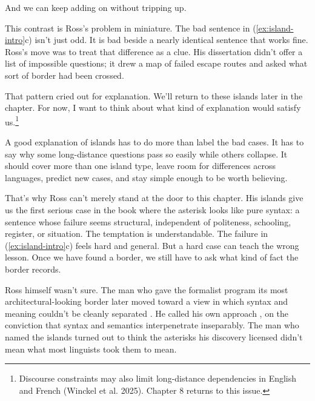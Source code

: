 \ea
\label{ex:non-island}
\z\z

And we can keep adding on without tripping up.

\ea
\label{ex:non-island-deep}
\z\z

This contrast is Ross's problem in miniature. The bad sentence in
(\ref{ex:island-intro}c) isn't just odd. It is bad beside a nearly
identical sentence that works fine. Ross's move was to treat that
difference as a clue. His dissertation didn't offer a list of impossible
questions; it drew a map of failed escape routes and asked what sort of
border had been crossed.

That pattern cried out for explanation. We'll return to these islands
later in the chapter. For now, I want to think about what kind of
explanation would satisfy us.\footnote{Discourse constraints may also
limit long-distance dependencies in English and French (Winckel et al.
2025). Chapter 8 returns to this issue. %
}



A good explanation of islands has to do more than label the bad cases. It
has to say why some long-distance questions pass so easily while others
collapse. It should cover more than one island type, leave room for
differences across languages, predict new cases, and stay simple enough
to be worth believing.

That's why Ross can't merely stand at the door to this chapter. His
islands give us the first serious case in the book where the asterisk
looks like pure syntax: a sentence whose failure seems structural,
independent of politeness, schooling, register, or situation. The
temptation is understandable. The failure in (\ref{ex:island-intro}c)
feels hard and general. But a hard case can teach the wrong lesson. Once
we have found a border, we still have to ask what kind of fact the border
records.

Ross himself wasn't sure. The man who gave the formalist program its most architectural-looking border later moved toward a view in which syntax and meaning couldn't be cleanly separated \citep{Harris2021}. He called his own approach , on the conviction that syntax and semantics interpenetrate inseparably. The man who named the islands turned out to think the asterisks his discovery licensed didn't mean what most linguists took them to mean.



